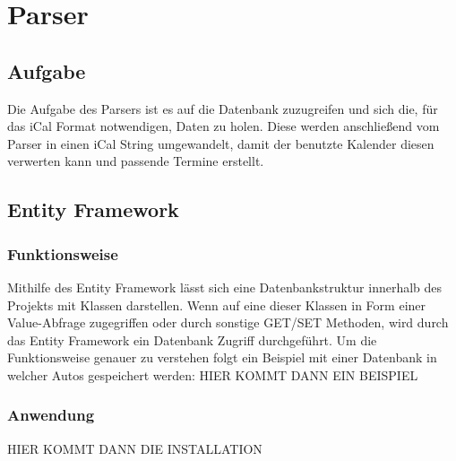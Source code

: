 \section{Parser}
\label{sec:parser}
\subsection{Aufgabe}
\label{sec:parser-aufgabe}
Die Aufgabe des Parsers ist es auf die Datenbank zuzugreifen und sich die, für das iCal Format notwendigen, Daten zu holen. Diese werden anschließend vom Parser in einen iCal String umgewandelt, damit der benutzte Kalender diesen verwerten kann und passende Termine erstellt. 

\subsection{Entity Framework}
\label{sec:parser-entity-framework}
\subsubsection {Funktionsweise}
Mithilfe des Entity Framework lässt sich eine Datenbankstruktur innerhalb des Projekts mit Klassen darstellen. Wenn auf eine dieser Klassen in Form einer Value-Abfrage zugegriffen oder durch sonstige GET/SET Methoden, wird durch das Entity Framework ein Datenbank Zugriff durchgeführt. 
Um die Funktionsweise genauer zu verstehen folgt ein Beispiel mit einer Datenbank in welcher Autos gespeichert werden:
HIER KOMMT DANN EIN BEISPIEL
\subsubsection {Anwendung}
HIER KOMMT DANN DIE INSTALLATION